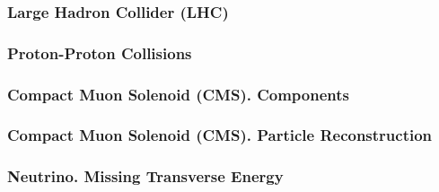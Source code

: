 \begin{frame}\frametitle{Large Hadron Collider (LHC)}

\end{frame}%


\begin{frame}\frametitle{Proton-Proton Collisions}

\end{frame}%


\begin{frame}\frametitle{Compact Muon Solenoid (CMS). Components}

\end{frame}%


\begin{frame}\frametitle{Compact Muon Solenoid (CMS). Particle Reconstruction}

\end{frame}%

 
\begin{frame}\frametitle{Neutrino. Missing Transverse Energy}

\end{frame}%
